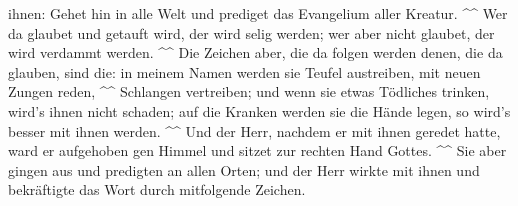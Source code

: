 ihnen: Gehet hin in alle Welt und prediget das Evangelium aller Kreatur.
\^{}\^{}  Wer da glaubet und getauft wird, der wird selig
werden; wer aber nicht glaubet, der wird verdammt werden. \^{}\^{}
 Die Zeichen aber, die da folgen werden denen, die da
glauben, sind die: in meinem Namen werden sie Teufel austreiben, mit
neuen Zungen reden, \^{}\^{}  Schlangen vertreiben; und
wenn sie etwas Tödliches trinken, wird's ihnen nicht schaden; auf die
Kranken werden sie die Hände legen, so wird's besser mit ihnen werden.
\^{}\^{}  Und der Herr, nachdem er mit ihnen geredet hatte,
ward er aufgehoben gen Himmel und sitzet zur rechten Hand Gottes.
\^{}\^{}  Sie aber gingen aus und predigten an allen Orten;
und der Herr wirkte mit ihnen und bekräftigte das Wort durch mitfolgende
Zeichen.

